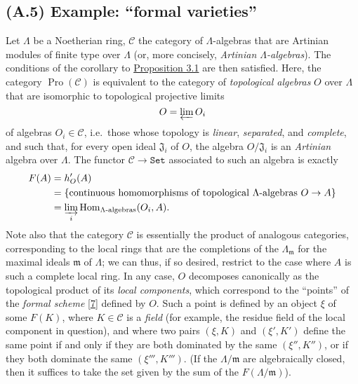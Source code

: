 \documentclass{article}
\newcommand{\oldpage}[1]{\marginpar{\footnotesize$\Big\vert$ \textit{p.~#1}}}
\theoremstyle{definition}
\theoremstyle{definition}
\theoremstyle{definition}
\theoremstyle{definition}
\theoremstyle{remark}
\begin{document}
\hypertarget{fga-3-ii-section-A.5}{%
\subsection{(A.5) Example: ``formal varieties''}\label{fga-3-ii-section-A.5}}

Let \(\Lambda\) be a Noetherian ring, \({\mathcal{C}}\) the category of \(\Lambda\)-algebras that are Artinian modules of finite type over \(\Lambda\) (or, more concisely, \emph{Artinian \(\Lambda\)-algebras}).
\oldpage{195-07}The conditions of the corollary to \protect\hyperlink{fga-3-ii-section-A.3-proposition-3.1}{Proposition 3.1} are then satisfied.
Here, the category \(\operatorname{Pro}({\mathcal{C}})\) is equivalent to the category of \emph{topological algebras} \(O\) over \(\Lambda\) that are isomorphic to topological projective limits
\[
  O = \varprojlim O_i
\]
of algebras \(O_i\in{\mathcal{C}}\), i.e.~those whose topology is \emph{linear}, \emph{separated}, and \emph{complete}, and such that, for every open ideal \({\mathfrak{J}}_i\) of \(O\), the algebra \(O/{\mathfrak{J}}_i\) is an \emph{Artinian} algebra over \(\Lambda\).
The functor \({\mathcal{C}}\to\mathtt{Set}\) associated to such an algebra is exactly
\[
  \begin{aligned}
    F(A)
    &= h'_{O}(A)
  \\&= \{\text{continuous homomorphisms of topological }\Lambda\text{-algebras }O\to A\}
  \\&= \varinjlim_i \operatorname{Hom}_{\Lambda\text{-algebras}}(O_i,A).
  \end{aligned}
\]
Note also that the category \({\mathcal{C}}\) is essentially the product of analogous categories, corresponding to the local rings that are the completions of the \(\Lambda_{{\mathfrak{m}}}\) for the maximal ideals \({\mathfrak{m}}\) of \(\Lambda\);
we can thus, if so desired, restrict to the case where \(A\) is such a complete local ring.
In any case, \(O\) decomposes canonically as the topological product of its \emph{local components}, which correspond to the ``points'' of the \emph{formal scheme} {[}\protect\hyperlink{ref-Gro1958a}{7}{]} defined by \(O\).
Such a point is defined by an object \(\xi\) of some \(F(K)\), where \(K\in{\mathcal{C}}\) is a \emph{field} (for example, the residue field of the local component in question), and where two pairs \((\xi,K)\) and \((\xi',K')\) define the same point if and only if they are both dominated by the same \((\xi'',K'')\), or if they both dominate the same \((\xi''',K''')\).
(If the \(\Lambda/{\mathfrak{m}}\) are algebraically closed, then it suffices to take the set given by the sum of the \(F(\Lambda/{\mathfrak{m}})\)).
\end{document}
